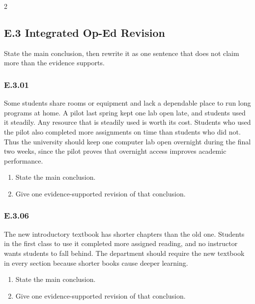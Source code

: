 \documentclass[10pt]{extarticle}
\newcommand{\bankitem}[1]{\subsubsection*{#1}}
\begin{document}
\begin{multicols}{2}
\subsection*{E.3 Integrated Op-Ed Revision}
State the main conclusion, then rewrite it as one sentence that does not claim
more than the evidence supports.
\begin{samepage}
\bankitem{E.3.01}
Some students share rooms or equipment and lack a dependable place to run long programs at home. A pilot last spring kept one lab open late, and students used it steadily. Any resource that is steadily used is worth its cost. Students who used the pilot also completed more assignments on time than students who did not. Thus the university should keep one computer lab open overnight during the final two weeks, since the pilot proves that overnight access improves academic performance.
\begin{enumerate}[label=(\alph*)]
  \item State the main conclusion.
  \item Give one evidence-supported revision of that conclusion.
\end{enumerate}
\end{samepage}\par\smallskip
\begin{samepage}
\bankitem{E.3.06}
The new introductory textbook has shorter chapters than the old one. Students in the first class to use it completed more assigned reading, and no instructor wants students to fall behind. The department should require the new textbook in every section because shorter books cause deeper learning.
\begin{enumerate}[label=(\alph*)]
  \item State the main conclusion.
  \item Give one evidence-supported revision of that conclusion.
\end{enumerate}
\end{samepage}\par\smallskip
\end{multicols}
\end{document}
